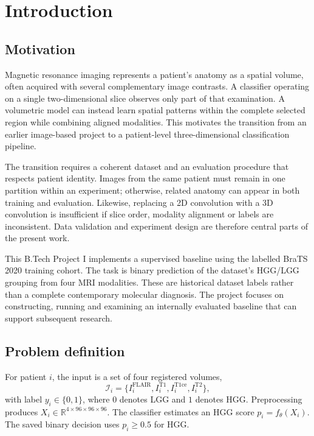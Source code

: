 \documentclass[12pt,a4paper,oneside]{report}
\renewcommand{\headrulewidth}{0.35pt}
\begin{document}
\clearpage
{}
\pagestyle{fancy}
\fancyhf{}
\fancyhead[L]{\small\nouppercase{\leftmark}}
\fancyfoot[C]{\thepage}
\renewcommand{\headrulewidth}{0.35pt}
\chapter{Introduction}
\label{ch:introduction}
\section{Motivation}
Magnetic resonance imaging represents a patient's anatomy as a spatial volume, often acquired with several complementary image contrasts. A classifier operating on a single two-dimensional slice observes only part of that examination. A volumetric model can instead learn spatial patterns within the complete selected region while combining aligned modalities. This motivates the transition from an earlier image-based project to a patient-level three-dimensional classification pipeline.

The transition requires a coherent dataset and an evaluation procedure that respects patient identity. Images from the same patient must remain in one partition within an experiment; otherwise, related anatomy can appear in both training and evaluation. Likewise, replacing a 2D convolution with a 3D convolution is insufficient if slice order, modality alignment or labels are inconsistent. Data validation and experiment design are therefore central parts of the present work.

This B.Tech Project I implements a supervised baseline using the labelled BraTS 2020 training cohort. The task is binary prediction of the dataset's HGG/LGG grouping from four MRI modalities. These are historical dataset labels rather than a complete contemporary molecular diagnosis. The project focuses on constructing, running and examining an internally evaluated baseline that can support subsequent research.

\section{Problem definition}
For patient $i$, the input is a set of four registered volumes,
\begin{equation}
\mathcal{I}_i=\{I_i^{\mathrm{FLAIR}},I_i^{\mathrm{T1}},I_i^{\mathrm{T1ce}},I_i^{\mathrm{T2}}\},
\end{equation}
with label $y_i\in\{0,1\}$, where $0$ denotes LGG and $1$ denotes HGG. Preprocessing produces $X_i\in\mathbb{R}^{4\times96\times96\times96}$. The classifier estimates an HGG score $p_i=f_\theta(X_i)$. The saved binary decision uses $p_i\geq0.5$ for HGG.
\end{document}
